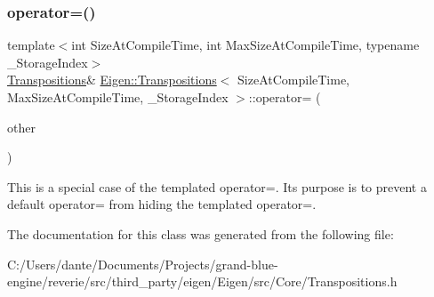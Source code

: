 \subsubsection{\texorpdfstring{operator=()}{operator=()}\hspace{0.1cm}{\footnotesize\ttfamily [2/2]}}
{\footnotesize\ttfamily template$<$int Size\+At\+Compile\+Time, int Max\+Size\+At\+Compile\+Time, typename \+\_\+\+Storage\+Index$>$ \\
\mbox{\hyperlink{class_eigen_1_1_transpositions}{Transpositions}}\& \mbox{\hyperlink{class_eigen_1_1_transpositions}{Eigen\+::\+Transpositions}}$<$ Size\+At\+Compile\+Time, Max\+Size\+At\+Compile\+Time, \+\_\+\+Storage\+Index $>$\+::operator= (\begin{DoxyParamCaption}\item[{const \mbox{\hyperlink{class_eigen_1_1_transpositions}{Transpositions}}$<$ Size\+At\+Compile\+Time, Max\+Size\+At\+Compile\+Time, \+\_\+\+Storage\+Index $>$ \&}]{other }\end{DoxyParamCaption})\hspace{0.3cm}{\ttfamily [inline]}}

This is a special case of the templated operator=. Its purpose is to prevent a default operator= from hiding the templated operator=. 

The documentation for this class was generated from the following file\+:\begin{DoxyCompactItemize}
\item 
C\+:/\+Users/dante/\+Documents/\+Projects/grand-\/blue-\/engine/reverie/src/third\+\_\+party/eigen/\+Eigen/src/\+Core/Transpositions.\+h\end{DoxyCompactItemize}
